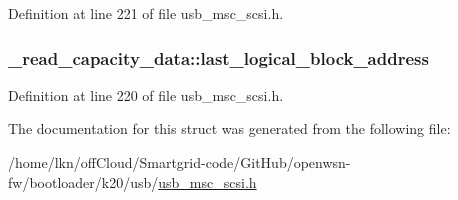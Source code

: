 Definition at line 221 of file usb\+\_\+msc\+\_\+scsi.\+h.

\subsubsection[{\texorpdfstring{last\+\_\+logical\+\_\+block\+\_\+address}{last_logical_block_address}}]{ \+\_\+read\+\_\+capacity\+\_\+data\+::last\+\_\+logical\+\_\+block\+\_\+address}\hypertarget{struct__read__capacity__data_aa5e87b0e8737d138a448ceb378142c9f}{}\label{struct__read__capacity__data_aa5e87b0e8737d138a448ceb378142c9f}


Definition at line 220 of file usb\+\_\+msc\+\_\+scsi.\+h.



The documentation for this struct was generated from the following file\+:\begin{DoxyCompactItemize}
\item 
/home/lkn/off\+Cloud/\+Smartgrid-\/code/\+Git\+Hub/openwsn-\/fw/bootloader/k20/usb/\hyperlink{usb__msc__scsi_8h}{usb\+\_\+msc\+\_\+scsi.\+h}\end{DoxyCompactItemize}
